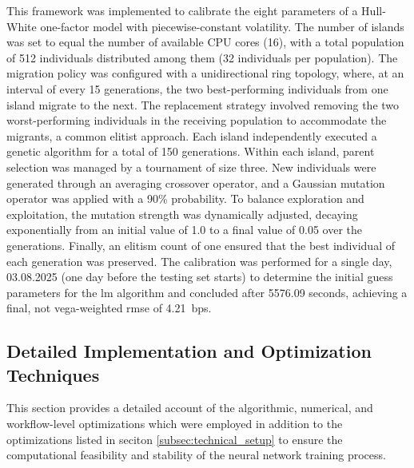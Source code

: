 This framework was implemented to calibrate the eight parameters of a Hull-White one-factor model with piecewise-constant volatility. The number of islands was set to equal the number of available CPU cores (16), with a total population of 512 individuals distributed among them (32 individuals per population). The migration policy was configured with a unidirectional ring topology, where, at an interval of every 15 generations, the two best-performing individuals from one island migrate to the next. The replacement strategy involved removing the two worst-performing individuals in the receiving population to accommodate the migrants, a common elitist approach. Each island independently executed a genetic algorithm for a total of 150 generations. Within each island, parent selection was managed by a tournament of size three. New individuals were generated through an averaging crossover operator, and a Gaussian mutation operator was applied with a 90\% probability. To balance exploration and exploitation, the mutation strength was dynamically adjusted, decaying exponentially from an initial value of 1.0 to a final value of 0.05 over the generations. Finally, an elitism count of one ensured that the best individual of each generation was preserved. The calibration was performed for a single day, 03.08.2025 (one day before the testing set starts) to determine the initial guess parameters for the \ac{lm} algorithm and concluded after 5576.09 seconds, achieving a final, not vega-weighted \ac{rmse} of 4.21~\ac{bps}.

\subsection{Detailed Implementation and Optimization Techniques}
\label{sec:appendix_implementation_details}
This section provides a detailed account of the algorithmic, numerical, and workflow-level optimizations which were employed in addition to the optimizations listed in seciton \ref{subsec:technical_setup} to ensure the computational feasibility and stability of the neural network training process.


